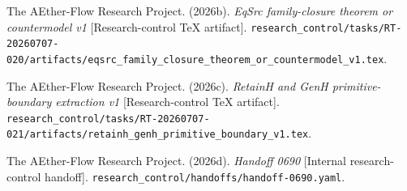 \documentclass[11pt]{article}
\begin{document}
The AEther-Flow Research Project. (2026b). \emph{EqSrc family-closure theorem
or countermodel v1} [Research-control TeX artifact].
\texttt{research\_control/tasks/RT-20260707-020/artifacts/eqsrc\_family\_closure\_theorem\_or\_countermodel\_v1.tex}.

The AEther-Flow Research Project. (2026c). \emph{RetainH and GenH
primitive-boundary extraction v1} [Research-control TeX artifact].
\texttt{research\_control/tasks/RT-20260707-021/artifacts/retainh\_genh\_primitive\_boundary\_v1.tex}.

The AEther-Flow Research Project. (2026d). \emph{Handoff 0690} [Internal
research-control handoff].
\texttt{research\_control/handoffs/handoff-0690.yaml}.
\end{document}
